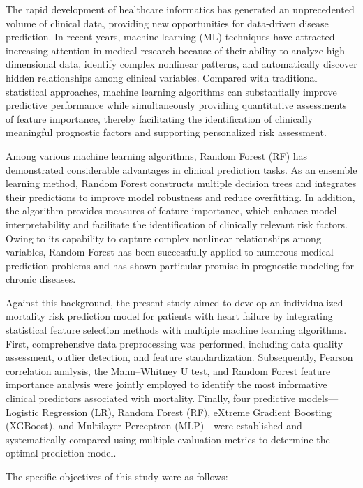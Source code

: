 \documentclass[12pt]{article}
\begin{document}
The rapid development of healthcare informatics has generated an unprecedented volume of clinical data, providing new opportunities for data-driven disease prediction. In recent years, machine learning (ML) techniques have attracted increasing attention in medical research because of their ability to analyze high-dimensional data, identify complex nonlinear patterns, and automatically discover hidden relationships among clinical variables. Compared with traditional statistical approaches, machine learning algorithms can substantially improve predictive performance while simultaneously providing quantitative assessments of feature importance, thereby facilitating the identification of clinically meaningful prognostic factors and supporting personalized risk assessment.\cite{Rajkomar2019,Esteva2019}

Among various machine learning algorithms, Random Forest (RF) has demonstrated considerable advantages in clinical prediction tasks. As an ensemble learning method, Random Forest constructs multiple decision trees and integrates their predictions to improve model robustness and reduce overfitting. In addition, the algorithm provides measures of feature importance, which enhance model interpretability and facilitate the identification of clinically relevant risk factors. Owing to its capability to capture complex nonlinear relationships among variables, Random Forest has been successfully applied to numerous medical prediction problems and has shown particular promise in prognostic modeling for chronic diseases.\cite{Breiman2001}

Against this background, the present study aimed to develop an individualized mortality risk prediction model for patients with heart failure by integrating statistical feature selection methods with multiple machine learning algorithms. First, comprehensive data preprocessing was performed, including data quality assessment, outlier detection, and feature standardization. Subsequently, Pearson correlation analysis, the Mann–Whitney U test, and Random Forest feature importance analysis were jointly employed to identify the most informative clinical predictors associated with mortality. Finally, four predictive models—Logistic Regression (LR), Random Forest (RF), eXtreme Gradient Boosting (XGBoost), and Multilayer Perceptron (MLP)—were established and systematically compared using multiple evaluation metrics to determine the optimal prediction model.

The specific objectives of this study were as follows:
\end{document}
